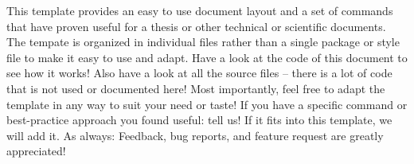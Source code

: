 
\emptydoublepage




%    
%    


\emptydoublepage
\tableofcontents







This template provides an easy to use document layout and a set of commands that have proven useful for a thesis or other technical or scientific documents. The tempate is organized in individual files rather than a single package or style file to make it easy to use and adapt. Have a look at the code of this document to see how it works! Also have a look at all the source files -- there is a lot of code that is not used or documented here! Most importantly, feel free to adapt the template in any way to suit your need or taste! If you have a specific command or best-practice approach you found useful: tell us! If it fits into this template, we will add it. As always: Feedback, bug reports, and feature request are greatly appreciated!

